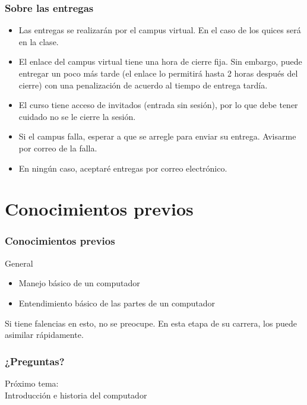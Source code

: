 \documentclass{beamer}
\begin{document}
	\begin{frame}
		\frametitle{Sobre las entregas}
		\begin{itemize}
			\item Las entregas se realizarán por el campus virtual. En el caso de los quices será en la clase.
			\item El enlace del campus virtual tiene una hora de cierre fija. Sin embargo, puede entregar un poco más tarde (el enlace lo permitirá hasta 2 horas después del cierre) con una penalización de acuerdo al tiempo de entrega tardía.
			\item El curso tiene acceso de invitados (entrada sin sesión), por lo que debe tener cuidado no se le cierre la sesión.
			\item Si el campus falla, esperar a que se arregle para enviar su entrega. Avisarme por correo de la falla.
			\item En ningún caso, aceptaré entregas por correo electrónico.
		\end{itemize}
	\end{frame}	

	\section{Conocimientos previos}	

	\begin{frame}
		\frametitle{Conocimientos previos}
		\begin{block}{General}
			\begin{itemize}
				\item Manejo básico de un computador
				\item Entendimiento básico de las partes de un computador
			\end{itemize}
			Si tiene falencias en esto, no se preocupe. En esta etapa de su carrera, los puede asimilar rápidamente.
		\end{block}
	\end{frame}	
		

	
\begin{frame}
	\frametitle{¿Preguntas?}
	\centering
	Próximo tema: \\Introducción e historia del computador
\end{frame}					
			
\end{document}
